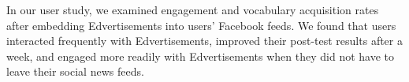 \documentclass{sigchi}
\begin{document}
In our user study, we examined engagement and vocabulary acquisition rates after embedding Edvertisements into users' Facebook feeds. We found that users interacted frequently with Edvertisements, improved their post-test results after a week, and engaged more readily with Edvertisements when they did not have to leave their social news feeds.




\end{document}
